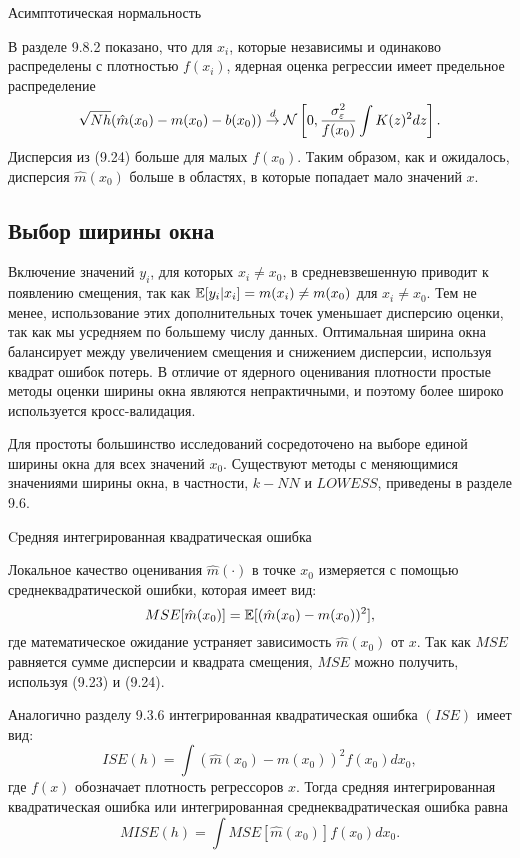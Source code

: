 \begin{center}
Асимптотическая нормальность
\end{center}

В разделе 9.8.2 показано, что для $x_i$, которые независимы и одинаково распределены с плотностью $f(x_i)$, ядерная оценка регрессии имеет предельное распределение 
\begin{equation}
\sqrt{Nh}(\hat{m}(x_0) - m(x_0) - b(x_0)) \stackrel{d}{\rightarrow} \mathcal{N}\left[ 0, \frac{\sigma_{\varepsilon}^2}{f(x_0)} \int K(z)^2dz \right].
\end{equation}
Дисперсия из (9.24) больше для малых $f(x_0)$. Таким образом, как и ожидалось, дисперсия $\hat{m}(x_0)$ больше в областях, в которые попадает мало значений $x$.

\subsection{Выбор ширины окна}

Включение значений $y_i$, для которых $x_i \not= x_0$, в средневзвешенную приводит к появлению смещения, так как $\mathbb{E}[y_i|x_i] = m(x_i) \not= m(x_0)$ для $x_i \not= x_0$. Тем не менее, использование этих дополнительных точек уменьшает дисперсию оценки, так как мы усредняем по большему числу данных. Оптимальная ширина окна балансирует между увеличением смещения и снижением дисперсии, используя квадрат ошибок потерь. В отличие от ядерного оценивания плотности простые методы оценки ширины окна являются непрактичными, и поэтому более широко используется кросс-валидация.

Для простоты большинство исследований сосредоточено на выборе единой ширины окна для всех значений $x_0$. Существуют методы с меняющимися значениями ширины окна, в частности, $k - NN$ и $LOWESS$, приведены в разделе 9.6.

\begin{center}
Cредняя интегрированная квадратическая ошибка
\end{center} 

Локальное качество оценивания $\hat{m}(\cdot)$ в точке $x_0$ измеряется с помощью среднеквадратической ошибки, которая имеет вид:
\[
MSE[\hat{m}(x_0)] = \mathbb{E}[(\hat{m}(x_0) - m(x_0))^2],
\]
где математическое ожидание устраняет зависимость $\hat{m}(x_0)$ от $x$. Так как $MSE$ равняется сумме дисперсии и квадрата смещения, $MSE$ можно получить, используя (9.23) и (9.24).

Аналогично разделу 9.3.6 интегрированная квадратическая ошибка $(ISE)$ имеет вид:
\[
ISE(h) = \int (\hat{m}(x_0) - m(x_0))^2f(x_0) dx_0,
\]
где $f(x)$ обозначает плотность регрессоров $x$. Тогда средняя интегрированная квадратическая ошибка или интегрированная среднеквадратическая ошибка равна
\[
MISE(h) = \int MSE[\hat{m}(x_0)]f(x_0)dx_0.
\]

